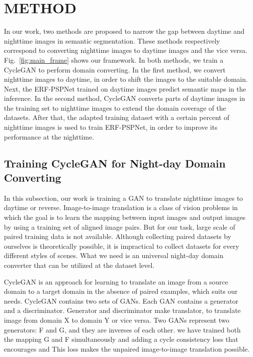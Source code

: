 \documentclass[a4paper]{spie}
\begin{document}
\section{METHOD}
\label{sec:sections}

In our work, two methods are proposed to narrow the gap between daytime and nighttime images in semantic segmentation. These methods respectively correspond to converting nighttime images to daytime images and the vice versa. Fig.~\ref{fig:main_frame} shows our framework. In both methods, we train a CycleGAN to perform domain converting. In the first method, we convert nighttime images to daytime, in order to shift the images to the suitable domain. Next, the ERF-PSPNet\cite{yang2018unifying,yang2019can} trained on daytime images predict semantic maps in the inference. In the second method, CycleGAN converts parts of daytime images in the training set to nighttime images to extend the domain coverage of the datasets. After that, the adapted training dataset with a certain percent of nighttime images is used to train ERF-PSPNet, in order to improve its performance at the nighttime.
 
\subsection{Training CycleGAN for Night-day Domain Converting}

In this subsection, our work is training a GAN to translate nighttime images to daytime or reverse. Image-to-image translation is a class of vision problems in which the goal is to learn the mapping between input images and output images by using a training set of aligned image pairs. But for our task, large scale of paired training data is not available. Although collecting paired datasets by ourselves is theoretically possible, it is impractical to collect datasets for every different styles of scenes. What we need is an universal night-day domain converter that can be utilized at the dataset level.

CycleGAN\cite{zhu2017unpaired} is an approach for learning to translate an image from a source domain to a target domain in the absence of paired examples, which suits our needs. CycleGAN contains two sets of GANs. Each GAN contains a generator and a discriminator. Generator and discriminator make translator, to translate image from domain X to domain Y or vice versa. Two GANs represent two generators: F and G, and they are inverses of each other. we have trained both the mapping G and F simultaneously and adding a cycle consistency loss that encourages  and 
This loss makes the unpaired image-to-image translation possible. 
\end{document}
